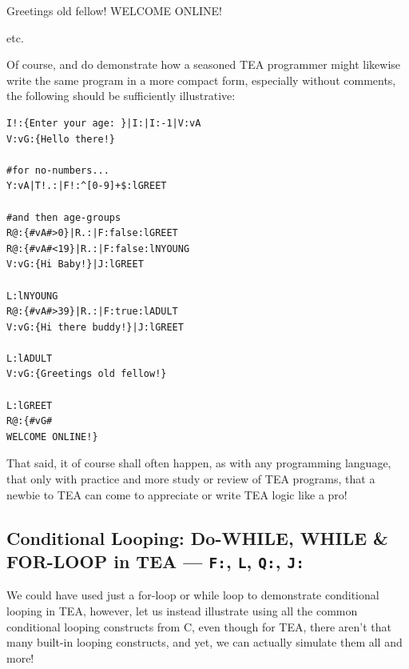 \documentclass[a4paper, 18pt]{book} %
\begin{document}
{{{\begin{appendices}
    
      \vspace{1em}
      
     \begin{tcbverbatim}[title=Age: 98]
Greetings old fellow!
WELCOME ONLINE!
      \end{tcbverbatim}

etc.

\vspace{2em}

Of course, and do demonstrate how a seasoned TEA programmer might likewise write the same program in a more compact form, especially without comments, the following should be sufficiently illustrative:


\vspace{2em}

  \begin{tcolorbox}[teaterminalstyle, title=TEA Control Flow: Age-Group Greeting Case (Compact), breakable]
  \begin{lstlisting}[language=TEA,breaklines=true,]
I!:{Enter your age: }|I:|I:-1|V:vA
V:vG:{Hello there!}

#for no-numbers...
Y:vA|T!.:|F!:^[0-9]+$:lGREET

#and then age-groups
R@:{#vA#>0}|R.:|F:false:lGREET
R@:{#vA#<19}|R.:|F:false:lNYOUNG
V:vG:{Hi Baby!}|J:lGREET 

L:lNYOUNG
R@:{#vA#>39}|R.:|F:true:lADULT
V:vG:{Hi there buddy!}|J:lGREET 

L:lADULT 
V:vG:{Greetings old fellow!}

L:lGREET 
R@:{#vG#
WELCOME ONLINE!}
   \end{lstlisting}
  \end{tcolorbox}

\vspace{2em}



That said, it of course shall often happen, as with any programming language, that only with practice and more study or review of TEA programs, that a newbie to TEA can come to appreciate or write TEA logic like a pro!


\subsection{Conditional Looping: Do-WHILE, WHILE \& FOR-LOOP in TEA --- \texttt{F:}, \texttt{L}, \texttt{Q:}, \texttt{J:}}
\label{LEARNTEATOPICCF_CON_LOO}

We could have used just a for-loop or while loop to demonstrate conditional looping in TEA, however, let us instead illustrate using all the common conditional looping constructs from C, even though for TEA, there aren't that many built-in looping constructs, and yet, we can actually simulate them all and more!


\end{appendices}}}}
\end{document}
